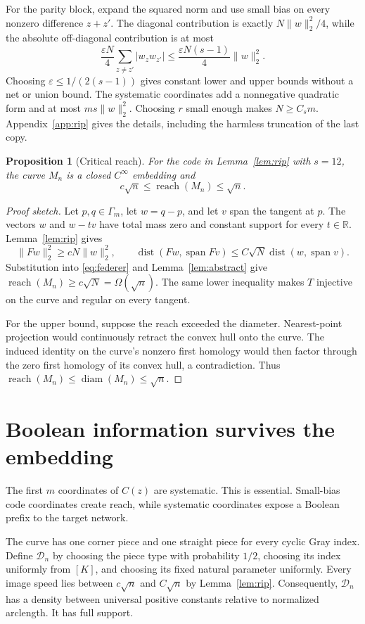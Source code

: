 \documentclass{article}
\newtheorem{proposition}[theorem]{Proposition}
\theoremstyle{definition}
\theoremstyle{remark}
\newcommand{\R}{\mathbb R}
\newcommand{\cD}{\mathcal D}
\newcommand{\1}{\mathbf 1}
\newcommand{\reach}{\operatorname{reach}}
\newcommand{\dist}{\operatorname{dist}}
\begin{document}
For the parity block, expand the squared norm and use small bias on every nonzero difference $z+z'$. The diagonal contribution is exactly $N\|w\|_2^2/4$, while the absolute off-diagonal contribution is at most \[ \frac{\varepsilon N}{4}\sum_{z\ne z'}|w_zw_{z'}| \leq\frac{\varepsilon N(s-1)}4\|w\|_2^2. \] Choosing $\varepsilon\leq1/(2(s-1))$ gives constant lower and upper bounds without a net or union bound. The systematic coordinates add a nonnegative quadratic form and at most $ms\|w\|_2^2$. Choosing $r$ small enough makes $N\geq C_sm$. Appendix~\ref{app:rip} gives the details, including the harmless truncation of the last copy.

\begin{proposition}[Critical reach]
\label{prop:reach}
For the code in Lemma~\ref{lem:rip} with $s=12$, the curve $M_n$ is a closed $C^\infty$ embedding and \[ c\sqrt n\leq\reach(M_n)\leq\sqrt n. \]
\end{proposition}

\begin{proof}[Proof sketch]
Let $p,q\in\Gamma_m$, let $w=q-p$, and let $v$ span the tangent at $p$. The vectors $w$ and $w-tv$ have total mass zero and constant support for every $t\in\R$. Lemma~\ref{lem:rip} gives \[ \|Fw\|_2^2\geq cN\|w\|_2^2, \qquad \dist(Fw,\operatorname{span}Fv) \leq C\sqrt N\dist(w,\operatorname{span}v). \] Substitution into \eqref{eq:federer} and Lemma~\ref{lem:abstract} give $\reach(M_n)\geq c\sqrt N=\Omega(\sqrt n)$. The same lower inequality makes $T$ injective on the curve and regular on every tangent.

For the upper bound, suppose the reach exceeded the diameter. Nearest-point projection would continuously retract the convex hull onto the curve. The induced identity on the curve's nonzero first homology would then factor through the zero first homology of its convex hull, a contradiction. Thus $\reach(M_n)\leq\operatorname{diam}(M_n)\leq\sqrt n$.
\end{proof}

\section{Boolean information survives the embedding}
\label{sec:boolean}

The first $m$ coordinates of $C(z)$ are systematic. This is essential. Small-bias code coordinates create reach, while systematic coordinates expose a Boolean prefix to the target network.

The curve has one corner piece and one straight piece for every cyclic Gray index. Define $\cD_n$ by choosing the piece type with probability $1/2$, choosing its index uniformly from $[K]$, and choosing its fixed natural parameter uniformly. Every image speed lies between $c\sqrt n$ and $C\sqrt n$ by Lemma~\ref{lem:rip}. Consequently, $\cD_n$ has a density between universal positive constants relative to normalized arclength. It has full support.
\end{document}
